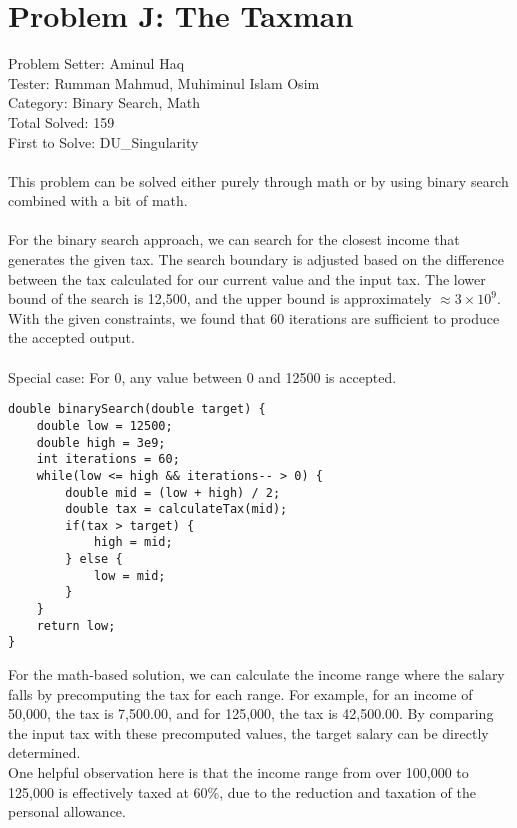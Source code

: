 \section*{Problem J: The Taxman}
Problem Setter: Aminul Haq \\
Tester: Rumman Mahmud,  Muhiminul Islam Osim \\
Category: Binary Search, Math \\
Total Solved: 159 \\
First to Solve: DU\_Singularity \\
\\
This problem can be solved either purely through math or by using binary search combined with a bit of math. \\
\\
For the binary search approach, we can search for the closest income that generates the given tax. 
The search boundary is adjusted based on the difference between the tax calculated for our current value and the input tax. 
The lower bound of the search is 12,500, and the upper bound is approximately \(\approx 3 \times 10^9\). With the given constraints, we found that 60 iterations are sufficient to produce the accepted output.\\
\\
Special case: For 0, any value between 0 and 12500 is accepted.
\begin{verbatim}
double binarySearch(double target) {
    double low = 12500;
    double high = 3e9;
    int iterations = 60;
    while(low <= high && iterations-- > 0) {
        double mid = (low + high) / 2;
        double tax = calculateTax(mid);
        if(tax > target) {
            high = mid;
        } else {
            low = mid;
        }
    }
    return low;
}
\end{verbatim}

For the math-based solution, we can calculate the income range where the salary falls by precomputing the tax for each range. For example, for an income of 50,000, the tax is 7,500.00, and for 125,000, the tax is 42,500.00. By comparing the input tax with these precomputed values, the target salary can be directly determined.\\
One helpful observation here is that the income range from over 100,000 to 125,000 is effectively taxed at 60\%, due to the reduction and taxation of the personal allowance.\\
\\
